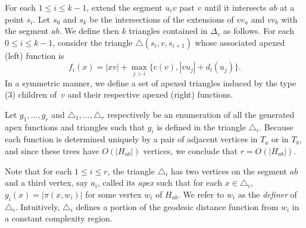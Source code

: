 \documentclass[a4paper,UKenglish]{lipics}
\newcommand{\g}[2]{\ensuremath{|\pi(#1, #2)|}}
\begin{document}
For each $1\leq i\leq k-1$, extend the segment $u_iv$ past $v$ until it intersects $ab$ at a point $s_i$. Let $s_0$ and $s_k$ be the intersections of the extensions of $vv_a$ and $vv_b$ with the segment $ab$.
We define then $k$ triangles contained in $\Delta_v$ as follows. 
For each $0\leq i\leq k-1$, consider the triangle $\triangle(s_i, v, s_{i+1})$ whose associated apexed (left) function is 
$$f_i(x) = |xv| + \max_{j>i}\{c(v), |vu_j| + d_l(u_j)\}.$$
In a symmetric manner, we define a set of apexed triangles induced by the type (3) children of~$v$ and their respective apexed (right) functions.

Let $g_1, \ldots, g_r$ and $\triangle_1, \ldots, \triangle_r$ respectively be an enumeration of all the generated apex functions and triangles such that $g_i$ is defined in the triangle $\triangle_i$. Because each function is determined uniquely by a pair of adjacent vertices in $T_a$ or in $T_b$, and since these trees have $O(|H_{ab}|)$ vertices, we conclude that $r = O(|H_{ab}|)$. 

Note that for each $1\leq i\leq r$, the triangle $\triangle_i$ has two vertices on the segment $ab$ and a third vertex, say $a_i$, called its \emph{apex} such that for each $x\in \triangle_i$, $g_i(x) = \g{x}{w_i}$ for some vertex $w_i$ of $H_{ab}$. We refer to $w_i$ as the \emph{definer} of $\triangle_i$. Intuitively, $\triangle_i$ defines a portion of the geodesic distance function from $w_i$ in a constant complexity region. 
\end{document}
